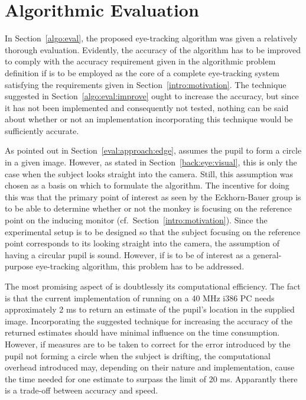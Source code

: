 
\section{Algorithmic Evaluation}
\label{concl:algo}

In Section~\ref{algo:eval}, the proposed eye-tracking algorithm
{\octopus} was given a relatively thorough evaluation.  Evidently, the
accuracy of the algorithm has to be improved to comply with the
accuracy requirement given in the algorithmic problem definition if
{\octopus} is to be employed as the core of a complete eye-tracking
system satisfying the requirements given in
Section~\ref{intro:motivation}.  The technique suggested in
Section~\ref{algo:eval:improve} ought to increase the accuracy, but
since it has not been implemented and consequently not tested, nothing
can be said about whether or not an implementation incorporating this
technique would be sufficiently accurate.

As pointed out in Section~\ref{eval:approach:edge}, {\octopus} assumes
the pupil to form a circle in a given image.  However, as stated in
Section~\ref{back:eye:visual}, this is only the case when the subject
looks straight into the camera.  Still, this assumption was chosen as
a basis on which to formulate the algorithm.  The incentive for doing
this was that the primary point of interest as seen by the
Eckhorn-Bauer group is to be able to determine whether or not the
monkey is focusing on the reference point on the inducing monitor
(cf.\ Section~\ref{intro:motivation}).  Since the experimental setup
is to be designed so that the subject focusing on the reference point
corresponds to its looking straight into the camera, the assumption of
having a circular pupil is sound.  However, if {\octopus} is to be of
interest as a general-purpose eye-tracking algorithm, this problem has
to be addressed.

The most promising aspect of {\octopus} is doubtlessly its
computational efficiency.  The fact is that the current implementation
of {\octopus} running on a 40 MHz i386 PC needs approximately 2 ms to
return an estimate of the pupil's location in the supplied image.
Incorporating the suggested technique for increasing the accuracy of
the returned estimates should have minimal influence on the time
consumption.  However, if measures are to be taken to correct for the
error introduced by the pupil not forming a circle when the subject is
drifting, the computational overhead introduced may, depending on
their nature and implementation, cause the time needed for one
estimate to surpass the limit of 20 ms.  Apparantly there is a
trade-off between accuracy and speed.
